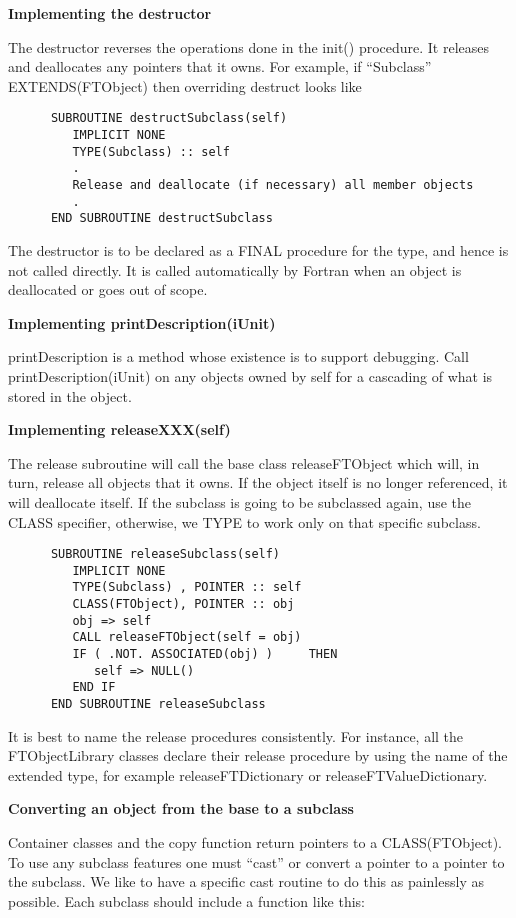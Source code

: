 \documentclass[9pt]{article}
\begin{document}
{\bf Implementing the destructor}

 The destructor reverses the operations done in the init() procedure. It releases and
 deallocates any pointers that it owns.  For example, if ``Subclass'' EXTENDS(FTObject) then overriding destruct looks like

{\color{blue}\begin{verbatim}
      SUBROUTINE destructSubclass(self) 
         IMPLICIT NONE
         TYPE(Subclass) :: self
         .
         Release and deallocate (if necessary) all member objects
         .
      END SUBROUTINE destructSubclass
\end{verbatim}}

The destructor is to be declared as a FINAL procedure for the type, and hence is not called directly. It is called automatically by Fortran
when an object is deallocated or goes out of scope.

{\bf Implementing printDescription(iUnit)}

 printDescription is a method whose existence is to support debugging. Call printDescription(iUnit)
 on any objects owned by self for a cascading of what is stored in the object.

{\bf Implementing releaseXXX(self)}

The release subroutine will call the base class releaseFTObject which will, in turn, release all objects that it
owns. If the object itself is no longer referenced, it will deallocate itself. If the subclass is going to be subclassed again, use the CLASS specifier, otherwise, we TYPE to work only on that specific subclass.

{\color{blue}\begin{verbatim}
      SUBROUTINE releaseSubclass(self)  
         IMPLICIT NONE
         TYPE(Subclass) , POINTER :: self
         CLASS(FTObject), POINTER :: obj
         obj => self
         CALL releaseFTObject(self = obj)
         IF ( .NOT. ASSOCIATED(obj) )     THEN
            self => NULL() 
         END IF      
      END SUBROUTINE releaseSubclass
\end{verbatim}}

It is best to name the release procedures consistently. For instance, all the FTObjectLibrary classes declare their 
release procedure by using the name of the extended type, for example releaseFTDictionary or releaseFTValueDictionary.

{\bf Converting an object from the base to a subclass}

 Container classes and the copy function return pointers to a CLASS(FTObject). To use
 any subclass features one must ``cast'' or convert a pointer to a pointer to the subclass. We like to have a specific 
 cast routine to do this as painlessly as possible. Each subclass should include a 
 function like this:
\end{document}
